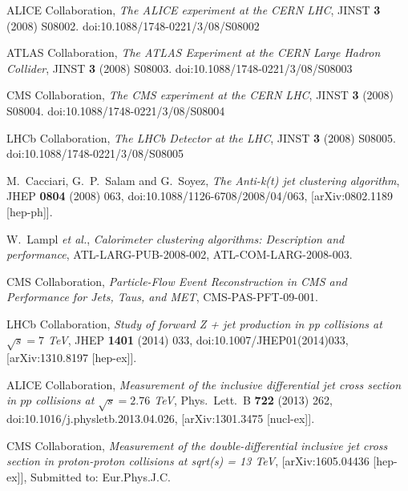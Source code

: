 \documentclass{PoS}
\begin{document}
\begin{thebibliography}{99}

  ALICE Collaboration,
  {\it The ALICE experiment at the CERN LHC},
  JINST {\bf 3} (2008) S08002.
  doi:10.1088/1748-0221/3/08/S08002

  ATLAS Collaboration,
  {\it The ATLAS Experiment at the CERN Large Hadron Collider},
  JINST {\bf 3} (2008) S08003.
  doi:10.1088/1748-0221/3/08/S08003

  CMS Collaboration,
  {\it The CMS experiment at the CERN LHC},
  JINST {\bf 3} (2008) S08004.
  doi:10.1088/1748-0221/3/08/S08004

  LHCb Collaboration,
  {\it The LHCb Detector at the LHC},
  JINST {\bf 3} (2008) S08005.
  doi:10.1088/1748-0221/3/08/S08005

  M.~Cacciari, G.~P.~Salam and G.~Soyez,
  {\it The Anti-k(t) jet clustering algorithm},
  JHEP {\bf 0804} (2008) 063,
  doi:10.1088/1126-6708/2008/04/063,
  [arXiv:0802.1189 [hep-ph]].

  W.~Lampl {\it et al.},
  {\it Calorimeter clustering algorithms: Description and performance},
  ATL-LARG-PUB-2008-002, ATL-COM-LARG-2008-003.

  CMS Collaboration,
  {\it Particle-Flow Event Reconstruction in CMS and Performance for Jets, Taus, and MET},
  CMS-PAS-PFT-09-001.

  LHCb Collaboration,
  {\it Study of forward Z + jet production in pp collisions at $\sqrt{s} = 7$ TeV},
  JHEP {\bf 1401} (2014) 033,
  doi:10.1007/JHEP01(2014)033,
  [arXiv:1310.8197 [hep-ex]].

  ALICE Collaboration,
  {\it Measurement of the inclusive differential jet cross section in $pp$ collisions at $\sqrt{s} = 2.76$ TeV},
  Phys.\ Lett.\ B {\bf 722} (2013) 262,
  doi:10.1016/j.physletb.2013.04.026,
  [arXiv:1301.3475 [nucl-ex]].

  CMS Collaboration, 
  {\it Measurement of the double-differential inclusive jet cross section in proton-proton collisions at sqrt(s) = 13 TeV},
  [arXiv:1605.04436 [hep-ex]], 
   Submitted to: Eur.Phys.J.C.


\end{thebibliography}
\end{document}
